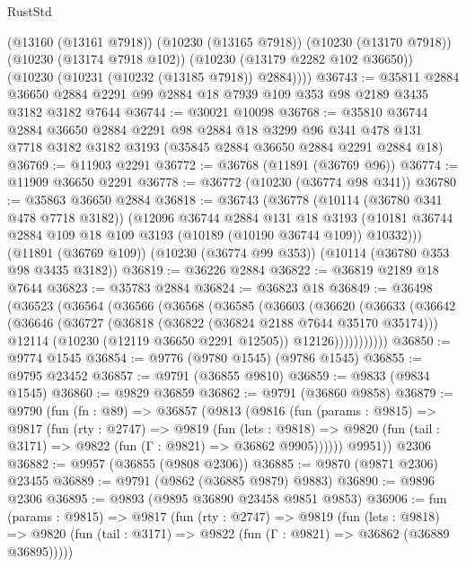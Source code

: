 \begin{lexlean}{RustStd}
\begin{coremodule}
        (@13160 (@13161 @7918))
        (@10230 (@13165 @7918))
        (@10230 (@13170 @7918))
        (@10230 (@13174 @7918 @102))
        (@10230 (@13179 @2282 @102 @36650))
        (@10230 (@10231 (@10232 (@13185 @7918)) @2884))))
@36743 := @35811
    @2884
    @36650
    @2884
    @2291
    @99
    @2884
    @18
    @7939
    @109
    @353
    @98
    @2189
    @3435
    @3182
    @3182
    @7644
@36744 := @30021 @10098
@36768 := @35810
    @36744
    @2884
    @36650
    @2884
    @2291
    @98
    @2884
    @18
    @3299
    @96
    @341
    @478
    @131
    @7718
    @3182
    @3182
    @3193
    (@35845 @2884 @36650 @2884 @2291 @2884 @18)
@36769 := @11903 @2291
@36772 := @36768 (@11891 (@36769 @96))
@36774 := @11909 @36650 @2291
@36778 := @36772 (@10230 (@36774 @98 @341))
@36780 := @35863 @36650 @2884
@36818 := @36743
    (@36778
      (@10114 (@36780 @341 @478 @7718 @3182))
      (@12096
        @36744
        @2884
        @131
        @18
        @3193
        (@10181 @36744 @2884 @109 @18 @109 @3193 (@10189 (@10190 @36744 @109)) @10332)))
    (@11891 (@36769 @109))
    (@10230 (@36774 @99 @353))
    (@10114 (@36780 @353 @98 @3435 @3182))
@36819 := @36226 @2884
@36822 := @36819 @2189 @18 @7644
@36823 := @35783 @2884
@36824 := @36823 @18
@36849 := @36498
    (@36523
      (@36564
        (@36566
          (@36568
            (@36585
              (@36603
                (@36620
                  (@36633
                    (@36642
                      (@36646
                        (@36727
                          (@36818 (@36822 (@36824 @2188 @7644 @35170 @35174)))
                          @12114
                          (@10230 (@12119 @36650 @2291 @12505))
                          @12126)))))))))))
@36850 := @9774 @1545
@36854 := @9776 (@9780 @1545) (@9786 @1545)
@36855 := @9795 @23452
@36857 := @9791 (@36855 @9810)
@36859 := @9833 (@9834 @1545)
@36860 := @9829 @36859
@36862 := @9791 (@36860 @9858)
@36879 := @9790
    (fun (fn : @89) =>
    @36857
      (@9813
        (@9816
          (fun (params : @9815) =>
          @9817
            (fun (rty : @2747) =>
            @9819
              (fun (lets : @9818) =>
              @9820 (fun (tail : @3171) => @9822 (fun (Γ : @9821) => @36862 @9905))))))
        @9951))
    @2306
@36882 := @9957 (@36855 (@9808 @2306))
@36885 := @9870 (@9871 @2306) @23455
@36889 := @9791 (@9862 (@36885 @9879) @9883)
@36890 := @9896 @2306
@36895 := @9893 (@9895 @36890 @23458 @9851 @9853)
@36906 := fun (params : @9815) =>
  @9817
    (fun (rty : @2747) =>
    @9819
      (fun (lets : @9818) =>
      @9820 (fun (tail : @3171) => @9822 (fun (Γ : @9821) => @36862 (@36889 @36895)))))

\end{coremodule}
\end{lexlean}
